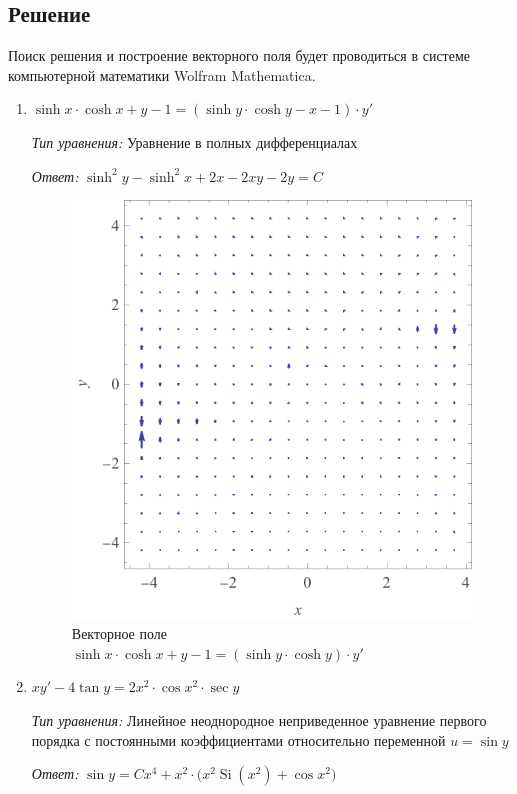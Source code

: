 \documentclass[a4paper, 14pt, titlepage, fleqn]{extarticle}
\DeclareMathOperator\Si{Si}
\begin{document}
		\subsection*{Решение}
			\noindent Поиск решения и построение векторного поля будет проводиться в системе компьютерной математики Wolfram Mathematica.
			\begin{enumerate}
				\item \(  \sinh{x} \cdot \cosh{x} + y - 1 = ( \sinh{y} \cdot \cosh{y} - x - 1) \cdot y'\)

					\textit{Тип уравнения:} Уравнение в полных дифференциалах
		
					\textit{Ответ:} \( \sinh^2{y} - \sinh^2{x} + 2x - 2xy - 2y = C \)
					
					\begin{figure}[H]
					    	\centering
					    	\includegraphics[width = .5\linewidth]{1.pdf}
					   	 \caption[.] {Векторное поле \\ \(\sinh{x} \cdot \cosh{x} + y - 1 = ( \sinh{y} \cdot \cosh{y}) \cdot y'\)}
  					\end{figure}

				\item \( xy' - 4 \tan{y} = 2x^2 \cdot \cos{x^2} \cdot \sec{y}\)
		
					\textit{Тип уравнения:} Линейное неоднородное неприведенное уравнение первого порядка с постоянными коэффициентами относительно переменной \( u = \sin{y} \)
		
					\textit{Ответ:} \( \sin{y} = Cx^4 + x^2 \cdot \big(x^2\Si{(x^2)} + \cos{x^2}\big) \)


\end{enumerate}
\end{document}
